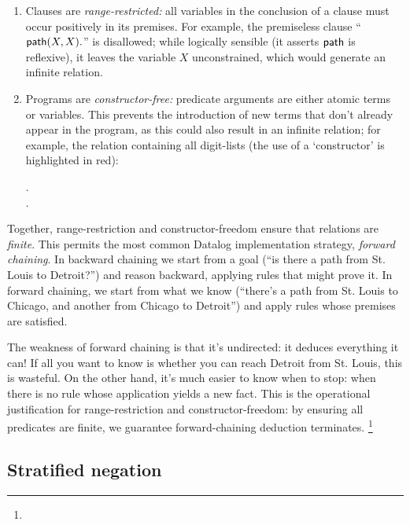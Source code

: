 \begin{enumerate}
\item Clauses are \emph{range-restricted:} all variables in the conclusion of a
  clause must occur positively in its premises. For example, the premiseless
  clause ``$\text{\sffamily path}({X,X}).$'' is disallowed; while logically sensible (it
  asserts $\text{\sffamily path}$ is reflexive), it leaves the variable $X$ unconstrained,
  which would generate an infinite relation.

\item Programs are \emph{constructor-free:} predicate arguments are either
  atomic terms or variables. This prevents the introduction of new terms that
  don't already appear in the program, as this could also result in an infinite
  relation; for example, the relation containing all digit-lists (the use of a
  `constructor' is highlighted in {\color{Red}red}):

  \nopagebreak[3]
  \begin{datalog}
    .
    \\
     \gets
     \conj {}.
  \end{datalog}
\end{enumerate}

\noindent
Together, range-restriction and constructor-freedom ensure that relations are
\emph{finite}. This permits the most common Datalog implementation strategy,
\emph{forward chaining}.
%
In backward chaining we start from a goal (``is there a path from St.
Louis to Detroit?'') and reason backward, applying rules that might prove it.
%
In forward chaining, we start from what we know (``there's a path from
St. Louis to Chicago, and another from Chicago to Detroit'') and apply rules
whose premises are satisfied.

The weakness of forward chaining is that it's undirected: it deduces everything
it can! If all you want to know is whether you can reach Detroit from St. Louis,
this is wasteful. On the other hand, it's much easier to know when to stop: when
there is no rule whose application yields a new fact. This is the operational
justification for range-restriction and constructor-freedom: by ensuring all
predicates are finite, we guarantee forward-chaining deduction terminates.%
%
\footnote{}



\subsection{Stratified negation}
\label{section-stratified-negation}

